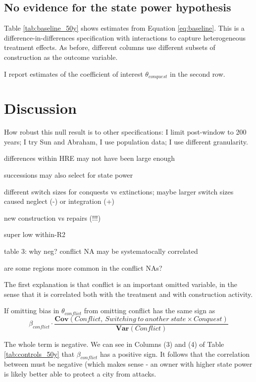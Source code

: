 \documentclass[11pt, a4paper]{article}
\begin{document}
\subsection{No evidence for the state power hypothesis}

Table \ref{tab:baseline_50y} shows estimates from Equation \eqref{eq:baseline}. This is a difference-in-differences specification with interactions to capture heterogeneous treatment effects. As before, different columns use different subsets of construction as the outcome variable.

I report estimates of the coefficient of interest $\theta_{conquest}$ in the second row. 




\section{Discussion} \label{sec:discussion}

How robust this null result is to other specifications: I limit post-window to 200 years; I try Sun and Abraham, I use population data; I use different granularity.

differences within HRE may not have been large enough

successions may also select for state power

different switch sizes for conquests vs extinctions; maybe larger switch sizes caused neglect (-) or integration (+)

new construction vs repairs (!!!)

super low within-R2



table 3: why neg? conflict NA may be systematocally correlated

are some regions more common in the conflict NAs?

The first explanation is that conflict is an important omitted variable, in the sense that it is correlated both with the treatment and with construction activity.

If omitting  bias in $\theta_{conflict}$ from omitting conflict has the same sign as 
$$\beta_{conflict} \cdot \frac{\mathbf{Cov}({Conflict},\: {Switching\: to\: another\: state \times Conquest})}{\mathbf{Var}(Conflict)}$$

The whole term is negative. We can see in Columns (3) and (4) of Table \ref{tab:controls_50y} that $\beta_{conflict}$ has a positive sign. It follows that the correlation between must be negative (which makes sense - an owner with higher state power is likely better able to protect a city from attacks.
\end{document}
